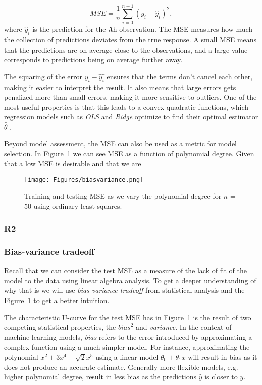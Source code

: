 \documentclass[amssymb,twocolumn,aps]{revtex4}
\begin{document}
$$MSE = \frac{1}{n}\sum_{i=0}^{n-1}(y_i-\hat{y}_i)^2,$$
where $\hat{y}_i$ is the prediction for the \textit{i}th observation. The MSE measures how much the collection of predictions deviates from the true response. A small MSE means that the predictions are on average close to the observations, and a large value corresponds to predictions being on average further away.

The squaring of the error $y_i-\hat{y_i}$ ensures that the terms don't cancel each other, making it easier to interpret the result. It also means that large errors gets penalized more than small errors, making it more sensitive to outliers. One of the most useful properties is that this leads to a convex quadratic functions, which regression models such as \textit{OLS} and \textit{Ridge} optimize to find their optimal estimator $\hat{\theta}$ \cite{introstat3}. 

Beyond model assessment, the MSE can also be used as a metric for model selection. In Figure~\ref{fig:biasvariancemse} we can see MSE as a function of polynomial degree. Given that a low MSE is desirable and that we are 

\begin{figure}[H]
    \centering
    \texttt{[image: Figures/biasvariance.png]}
    \caption{Training and testing MSE as we vary the polynomial degree for $n$ = 50 using ordinary least squares.}
    \label{fig:biasvariancemse}
\end{figure}

\subsubsection{R2}

\subsubsection{Bias-variance tradeoff}
Recall that we can consider the test MSE as a measure of the lack of fit of the model to the data using linear algebra analysis. To get a deeper understanding of why that is we will use \textit{bias-variance tradeoff} from statistical analysis and the Figure~\ref{fig:biasvariancemse} to get a better intuition.

The characteristic U-curve for the test MSE has in Figure~\ref{fig:biasvariancemse} is the result of two competing statistical properties, the $\textit{bias}^2$ and \textit{variance}. In the context of machine learning models, \textit{bias} refers to the error introduced by approximating a complex function using a much simpler model. For instance, approximating the polynomial $x^2+3x^4+\sqrt{2}x^5$ using a linear model $\theta_0 +\theta_1x$ will result in bias as it does not produce an accurate estimate. Generally more flexible models, e.g. higher polynomial degree, result in less bias \cite{introstat2} as the predictions $\hat{y}$ is closer to $y$. 
\end{document}
